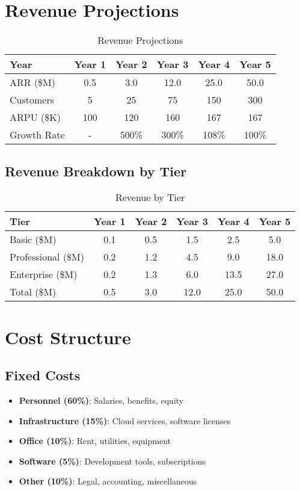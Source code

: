 \documentclass[business]{../templates/infraradar-main}
\begin{document}
\section{Revenue Projections}

\begin{table}[h]
\centering
\begin{tabular}{|l|c|c|c|c|c|}
\hline
\textbf{Year} & \textbf{Year 1} & \textbf{Year 2} & \textbf{Year 3} & \textbf{Year 4} & \textbf{Year 5} \\
\hline
ARR (\$M) & 0.5 & 3.0 & 12.0 & 25.0 & 50.0 \\
\hline
Customers & 5 & 25 & 75 & 150 & 300 \\
\hline
ARPU (\$K) & 100 & 120 & 160 & 167 & 167 \\
\hline
Growth Rate & - & 500\% & 300\% & 108\% & 100\% \\
\hline
\end{tabular}
\caption{Revenue Projections}
\end{table}

\subsection{Revenue Breakdown by Tier}
\begin{table}[h]
\centering
\begin{tabular}{|l|c|c|c|c|c|}
\hline
\textbf{Tier} & \textbf{Year 1} & \textbf{Year 2} & \textbf{Year 3} & \textbf{Year 4} & \textbf{Year 5} \\
\hline
Basic (\$M) & 0.1 & 0.5 & 1.5 & 2.5 & 5.0 \\
\hline
Professional (\$M) & 0.2 & 1.2 & 4.5 & 9.0 & 18.0 \\
\hline
Enterprise (\$M) & 0.2 & 1.3 & 6.0 & 13.5 & 27.0 \\
\hline
Total (\$M) & 0.5 & 3.0 & 12.0 & 25.0 & 50.0 \\
\hline
\end{tabular}
\caption{Revenue by Tier}
\end{table}

\section{Cost Structure}

\subsection{Fixed Costs}
\begin{itemize}
    \item \textbf{Personnel (60\%)}: Salaries, benefits, equity
    \item \textbf{Infrastructure (15\%)}: Cloud services, software licenses
    \item \textbf{Office (10\%)}: Rent, utilities, equipment
    \item \textbf{Software (5\%)}: Development tools, subscriptions
    \item \textbf{Other (10\%)}: Legal, accounting, miscellaneous
\end{itemize}
\end{document}
